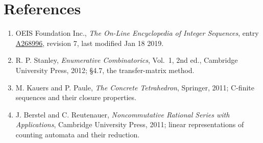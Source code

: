 \documentclass[11pt]{article}
\theoremstyle{definition}
\begin{document}
\section{References}

\begin{enumerate}

\item OEIS Foundation Inc., \emph{The On-Line Encyclopedia of Integer Sequences}, entry \href{https://oeis.org/A268996}{A268996}, revision 7, last modified Jan 18 2019.

\item R. P. Stanley, \emph{Enumerative Combinatorics}, Vol.~1, 2nd ed., Cambridge University Press, 2012; \S4.7, the transfer-matrix method.

\item M. Kauers and P. Paule, \emph{The Concrete Tetrahedron}, Springer, 2011; C-finite sequences and their closure properties.

\item J. Berstel and C. Reutenauer, \emph{Noncommutative Rational Series with Applications}, Cambridge University Press, 2011; linear representations of counting automata and their reduction.

\end{enumerate}
\end{document}
